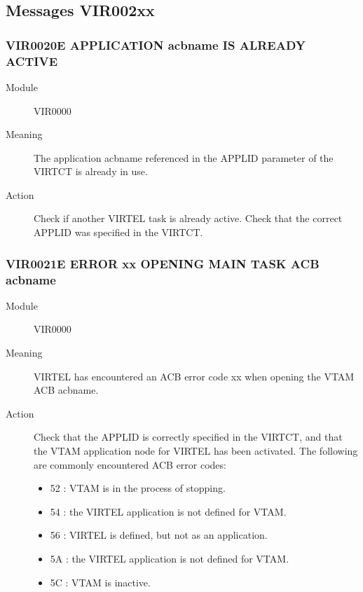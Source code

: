 \documentclass[letterpaper,10pt,english]{sphinxmanual}
\begin{document}
\subsection{Messages VIR002xx}
\label{\detokenize{messages:messages-vir002xx}}

\subsubsection{VIR0020E APPLICATION acbname IS ALREADY ACTIVE}
\label{\detokenize{messages:vir0020e-application-acbname-is-already-active}}\begin{description}
\item[{Module}] \leavevmode
VIR0000

\item[{Meaning}] \leavevmode
The application acbname referenced in the APPLID parameter of the VIRTCT is already in use.

\item[{Action}] \leavevmode
Check if another VIRTEL task is already active. Check that the correct APPLID was specified in the VIRTCT.

\end{description}


\subsubsection{VIR0021E ERROR xx OPENING MAIN TASK ACB acbname}
\label{\detokenize{messages:vir0021e-error-xx-opening-main-task-acb-acbname}}\begin{description}
\item[{Module}] \leavevmode
VIR0000

\item[{Meaning}] \leavevmode
VIRTEL has encountered an ACB error code xx when opening the VTAM ACB acbname.

\item[{Action}] \leavevmode
Check that the APPLID is correctly specified in the VIRTCT, and that the VTAM application node for VIRTEL has been activated. The following are commonly encountered ACB error codes:
\begin{itemize}
\item {} 
52 : VTAM is in the process of stopping.

\item {} 
54 : the VIRTEL application is not defined for VTAM.

\item {} 
56 : VIRTEL is defined, but not as an application.

\item {} 
5A : the VIRTEL application is not defined for VTAM.

\item {} 
5C : VTAM is inactive.

\end{itemize}

\end{description}
\end{document}

